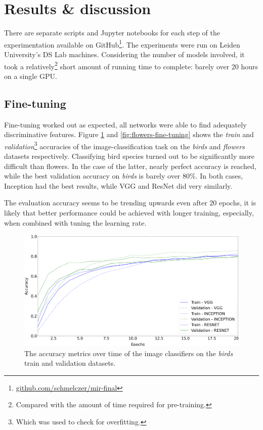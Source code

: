 \section{Results \& discussion}

There are separate scripts and Jupyter notebooks for each step of the experimentation available on GitHub\footnote{\href{https://github.com/schmelczer/mir-final}{github.com/schmelczer/mir-final}}. The experiments were run on Leiden University's DS Lab machines. Considering the number of models involved, it took a relatively\footnote{Compared with the amount of time required for pre-training.} short amount of running time to complete: barely over 20 hours on a single GPU.

\subsection{Fine-tuning}

Fine-tuning worked out as expected, all networks were able to find adequately discriminative features. Figure \ref{fig:birds-fine-tuning} and \ref{fig:flowers-fine-tuning} shows the \textit{train} and \textit{validation}\footnote{Which was used to check for overfitting.} accuracies of the image-classification task on the \textit{birds} and \textit{flowers} datasets respectively. Classifying bird species turned out to be significantly more difficult than flowers. In the case of the latter, nearly perfect accuracy is reached, while the best validation accuracy on \textit{birds} is barely over 80\%. In both cases, Inception had the best results, while VGG and ResNet did very similarly. 

The evaluation accuracy seems to be trending upwards even after $20$ epochs, it is likely that better performance could be achieved with longer training, especially, when combined with tuning the learning rate.

\begin{figure}
  \centering
  \includegraphics[width=1 \linewidth]{figures/birds-finetuning.png}
  \caption{The accuracy metrics over time of the image classifiers on the \textit{birds} train and validation datasets.}
  \label{fig:birds-fine-tuning}
\end{figure}

